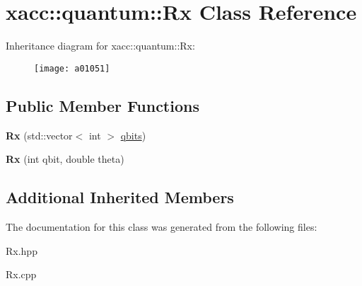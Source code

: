 \hypertarget{a01051}{}\section{xacc\+:\+:quantum\+:\+:Rx Class Reference}
\label{a01051}
Inheritance diagram for xacc\+:\+:quantum\+:\+:Rx\+:\begin{figure}[H]
\begin{center}
\leavevmode
\texttt{[image: a01051]}
\end{center}
\end{figure}
\subsection*{Public Member Functions}
\begin{DoxyCompactItemize}
\item 
\mbox{\label{a01051_a03babfe938a6cbf7f744fcd31a52d92d}} 
{\bfseries Rx} (std\+::vector$<$ int $>$ \hyperlink{a01015_a2a56be6c2519ea65df4d06f4abae1393}{qbits})
\item 
\mbox{\label{a01051_a01667b11d34d5621b98ebff9a07d9bbf}} 
{\bfseries Rx} (int qbit, double theta)
\end{DoxyCompactItemize}
\subsection*{Additional Inherited Members}


The documentation for this class was generated from the following files\+:\begin{DoxyCompactItemize}
\item 
Rx.\+hpp\item 
Rx.\+cpp\end{DoxyCompactItemize}
